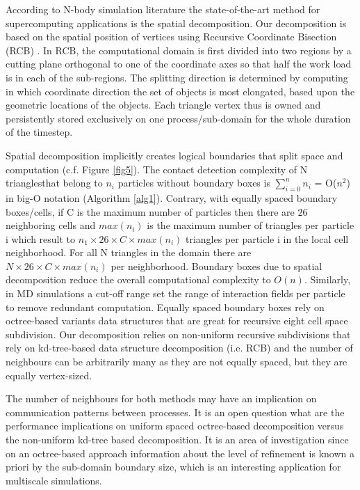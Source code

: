 \documentclass[times,12pt]{article}
\begin{document}
According to N-body simulation literature \cite{Eckhardt2014, Fleissner, Wachs2012a, zomorodian2002} the state-of-the-art method for supercomputing applications is the spatial decomposition. Our decomposition is based on the spatial position of vertices using Recursive Coordinate Bisection (RCB) \cite{ZoltanIsorropiaOverview2012}. In RCB, the computational domain is first divided into two regions by a cutting plane orthogonal to one of the coordinate axes so that half the work load is in each of the sub-regions. The splitting direction is determined by computing in which coordinate direction the set of objects is most elongated, based upon the geometric locations of the objects. Each triangle vertex thus is owned and persistently stored exclusively on one process/sub-domain for the whole duration of the timestep. 

Spatial decomposition implicitly creates logical boundaries that split space and computation (c.f. Figure \ref{fig5}). The contact detection complexity of N trianglesthat belong to $n_{i}$ particles without boundary boxes is $\sum\limits_{i=0}^n n_{i}$ = O($n^2$) in big-O notation (Algorithm \ref{alg1}). Contrary, with equally spaced boundary boxes/cells, if C is the maximum number of particles then there are $26$ neighboring cells and $max(n_{i})$ is the maximum number of triangles per particle i which result to $n_{1} \times 26 \times C \times max(n_{i})$ triangles per particle i in the local cell neighborhood. For all N triangles in the domain there are $N \times 26 \times C \times max(n_{i})$ per neighborhood. Boundary boxes due to spatial decomposition reduce the overall computational complexity to $O(n)$. Similarly, in MD simulations a cut-off range set the range of interaction fields per particle to remove redundant computation. Equally spaced boundary boxes rely on octree-based variants data structures that are great for recursive eight cell space subdivision. Our decomposition relies on non-uniform recursive subdivisions that rely on kd-tree-based data structure decomposition \cite{Brown2015} (i.e. RCB) and the number of neighbours can be arbitrarily many as they are not equally spaced, but they are equally vertex-sized. 

The number of neighbours for both methods may have an implication on communication patterns between processes. It is an open question what are the performance implications on uniform spaced octree-based decomposition versus the non-uniform kd-tree based decomposition. It is an area of investigation since on an octree-based approach information about the level of refinement is known a priori by the sub-domain boundary size, which is an interesting application for multiscale simulations. 
\end{document}
